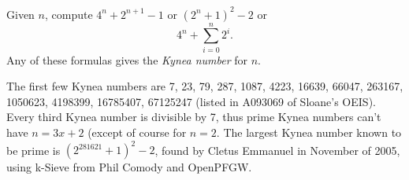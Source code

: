 \documentclass[12pt]{article}
\begin{document}
Given $n$, compute $4^n + 2^{n + 1} - 1$ or $(2^n + 1)^2 - 2$ or $$4^n + \sum_{i = 0}^n 2^i.$$ Any of these formulas gives the \emph{Kynea number} for $n$.

The first few Kynea numbers are 7, 23, 79, 287, 1087, 4223, 16639, 66047, 263167, 1050623, 4198399, 16785407, 67125247 (listed in A093069 of Sloane's OEIS). Every third Kynea number is divisible by 7, thus prime Kynea numbers can't have $n = 3x + 2$ (except of course for $n = 2$. The largest Kynea number known to be prime is $(2^{281621} + 1)^2 - 2$, found by Cletus Emmanuel in November of 2005, using k-Sieve from Phil Comody and OpenPFGW.
\end{document}
